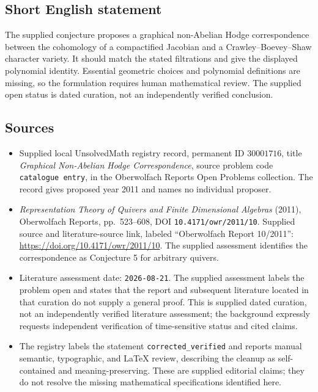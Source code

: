 \documentclass[11pt]{article}
\begin{document}
\subsection{Short English statement}
The supplied conjecture proposes a graphical non-Abelian Hodge correspondence between the cohomology of a compactified Jacobian and a Crawley--Boevey--Shaw character variety. It should match the stated filtrations and give the displayed polynomial identity. Essential geometric choices and polynomial definitions are missing, so the formulation requires human mathematical review. The supplied open status is dated curation, not an independently verified conclusion.
\subsection{Sources}
\begin{itemize}
\item Supplied local UnsolvedMath registry record, permanent ID \(30001716\), title \emph{Graphical Non-Abelian Hodge Correspondence}, source problem code \texttt{catalogue entry}, in the Oberwolfach Reports Open Problems collection. The record gives proposed year 2011 and names no individual proposer.
\item \emph{Representation Theory of Quivers and Finite Dimensional Algebras} (2011), Oberwolfach Reports, pp.\ 523--608, DOI \texttt{10.4171/owr/2011/10}. Supplied source and literature-source link, labeled ``Oberwolfach Report 10/2011'': \url{https://doi.org/10.4171/owr/2011/10}. The supplied assessment identifies the correspondence as Conjecture 5 for arbitrary quivers.
\item Literature assessment date: \texttt{2026-08-21}. The supplied assessment labels the problem open and states that the report and subsequent literature located in that curation do not supply a general proof. This is supplied dated curation, not an independently verified literature assessment; the background expressly requests independent verification of time-sensitive status and cited claims.
\item The registry labels the statement \texttt{corrected\_verified} and reports manual semantic, typographic, and LaTeX review, describing the cleanup as self-contained and meaning-preserving. These are supplied editorial claims; they do not resolve the missing mathematical specifications identified here.
\end{itemize}
\end{document}

